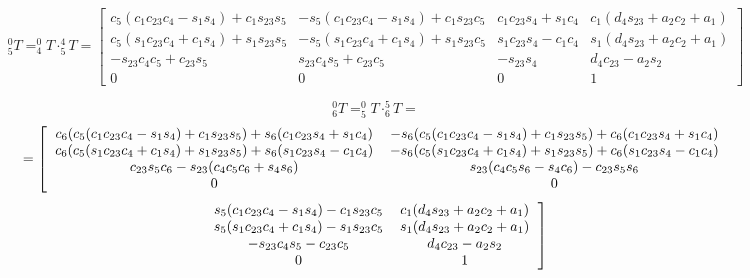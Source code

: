 \documentclass{article}
\begin{document}
\[
_{5}^{0}T= _{4}^{0}T \cdot _{5}^{4}T = 
\begin{bmatrix}
c_5(c_1c_{23}c_4-s_1s_4)+c_1s_{23}s_5	&-s_5(c_1c_{23}c_4-s_1s_4)+c_1s_{23}c_5	&c_1c_{23}s_4+s_1c_4	&c_1(d_4s_{23}+a_2c_2+a_1)	\\
c_5(s_1c_{23}c_4+c_1s_4)+s_1s_{23}s_5	&-s_5(s_1c_{23}c_4+c_1s_4)+s_1s_{23}c_5	&s_1c_{23}s_4-c_1c_4	&s_1(d_4s_{23}+a_2c_2+a_1)	\\
-s_{23}c_4c_5+c_{23}s_5	&s_{23}c_4s_5+c_{23}c_5	&-s_{23}s_4	&d_4c_{23}-a_2s_2	\\
0	&0	&0	&1	
 \end{bmatrix}
\]
\pagebreak

\[_{6}^{0}T= _{5}^{0}T \cdot _{6}^{5}T = \]
\[ =
\left [
  \begin{tabular}{cc}
$c_6(c_5(c_1c_{23}c_4-s_1s_4)+c_1s_{23}s_5)+s_6(c_1c_{23}s_4+s_1c_4)	$	&$-s_6(c_5(c_1c_{23}c_4-s_1s_4)+c_1s_{23}s_5)+c_6(c_1c_{23}s_4+s_1c_4)$ 	\\
$c_6(c_5(s_1c_{23}c_4+c_1s_4)+s_1s_{23}s_5)+s_6(s_1c_{23}s_4-c_1c_4)	$	&$-s_6(c_5(s_1c_{23}c_4+c_1s_4)+s_1s_{23}s_5)+c_6(s_1c_{23}s_4-c_1c_4)$	\\
$c_{23}s_5c_6-s_{23}(c_4c_5c_6+s_4s_6)						$	&$s_{23}(c_4c_5s_6-s_4c_6)-c_{23}s_5s_6$		   					\\
$0												$	&$0$												
  \end{tabular}
\right .
\]
\[
\left .
  \begin{tabular}{cc}
$s_5(c_1c_{23}c_4-s_1s_4)-c_1s_{23}c_5	$	&$c_1(d_4s_{23}+a_2c_2+a_1)$ \\
$s_5(s_1c_{23}c_4+c_1s_4)-s_1s_{23}c_5	$	&$s_1(d_4s_{23}+a_2c_2+a_1)$ \\
$-s_{23}c_4s_5-c_{23}c_5			$	&$d_4c_{23}-a_2s_2$		   \\
$0							$	&$1$												
  \end{tabular}
\right ]
\]

\end{document}
